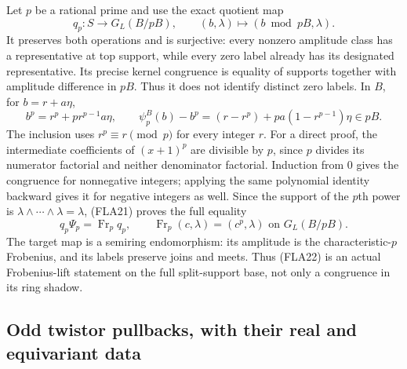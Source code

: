 Let $p$ be a rational prime and use the exact quotient map
\begin{equation}\tag{FLA20}
 q_p:S\longrightarrow G_L(B/pB),\qquad
 (b,\lambda)\longmapsto(b\bmod pB,\lambda).
\end{equation}
It preserves both operations and is surjective: every nonzero
amplitude class has a representative at top support, while every
zero label already has its designated representative. Its precise
kernel congruence is equality of supports together with amplitude
difference in $pB$. Thus it does not identify distinct zero labels.
In $B$, for $b=r+a\eta$,
\begin{equation}\tag{FLA21}
 b^p=r^p+p r^{p-1}a\eta,\qquad
 \psi_p^B(b)-b^p=(r-r^p)+p a(1-r^{p-1})\eta\in pB.
\end{equation}
The inclusion uses $r^p\equiv r\pmod p$ for every integer $r$.
For a direct proof, the intermediate coefficients of $(x+1)^p$
are divisible by $p$, since $p$ divides its numerator factorial
and neither denominator factorial. Induction from $0$ gives the
congruence for nonnegative integers; applying the same polynomial
identity backward gives it for negative integers as well.
Since the support of the $p$th power is $\lambda\wedge\cdots
\wedge\lambda=\lambda$, (FLA21) proves the full equality
\begin{equation}\tag{FLA22}
 q_p\Psi_p=\operatorname{Fr}_p q_p,\qquad
 \operatorname{Fr}_p(c,\lambda)=(c^p,\lambda)
                        \text{ on }G_L(B/pB).
\end{equation}
The target map is a semiring endomorphism: its amplitude is the
characteristic-$p$ Frobenius, and its labels preserve joins and
meets. Thus (FLA22) is an actual Frobenius-lift statement on the
full split-support base, not only a congruence in its ring shadow.

\subsection{Odd twistor pullbacks, with their real and equivariant data}

